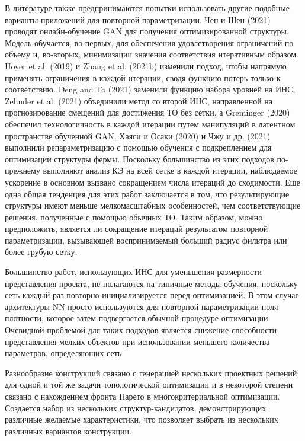 В литературе также предпринимаются попытки использовать другие подобные варианты приложений для повторной параметризации. Чен и Шен (2021) проводят онлайн-обучение GAN для получения оптимизированной структуры. Модель обучается, во-первых, для обеспечения удовлетворения ограничений по объему и, во-вторых, минимизации значения соответствия итеративным образом. Hoyer et al. (2019) и Zhang et al. (2021b) изменили подход, чтобы напрямую применять ограничения в каждой итерации, сводя функцию потерь только к соответствию. Deng and To (2021) заменили функцию набора уровней на ИНС, Zehnder et al. (2021) объединили метод со второй ИНС, направленной на прогнозирование смещений для достижения ТО без сетки, а Greminger (2020) обеспечил технологичность в каждой итерации путем манипуляций в латентном пространстве обученной GAN. Хаяси и Осаки (2020) и Чжу и др. (2021) выполнили репараметризацию с помощью обучения с подкреплением для оптимизации структуры фермы. Поскольку большинство из этих подходов по-прежнему выполняют анализ КЭ на всей сетке в каждой итерации, наблюдаемое ускорение в основном вызвано сокращением числа итераций до сходимости. Еще одна общая тенденция для этих работ заключается в том, что результирующие структуры имеют меньше мелкомасштабных особенностей, чем соответствующие решения, полученные с помощью обычных ТО. Таким образом, можно предположить, является ли сокращение итераций результатом повторной параметризации, вызывающей воспринимаемый больший радиус фильтра или более грубую сетку.

Большинство работ, использующих ИНС для уменьшения размерности представления проекта, не полагаются на типичные методы обучения, поскольку сеть каждый раз повторно инициализируется перед оптимизацией. В этом случае архитектуры NN просто используются для повторной параметризации поля плотности, которое затем подвергается обычной процедуре оптимизации. Очевидной проблемой для таких подходов является снижение способности представления мелких объектов при использовании меньшего количества параметров, определяющих сеть.





Разнообразие конструкций связано с генерацией нескольких проектных решений для одной и той же задачи топологической оптимизации и в некоторой степени связано с нахождением фронта Парето в  многокритериальной оптимизации. Создается набор из нескольких структур-кандидатов, демонстрирующих различные желаемые характеристики, что позволяет выбрать из нескольких различных вариантов конструкции.

